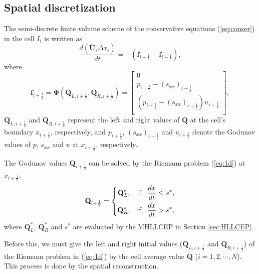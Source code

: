 \documentclass[review]{elsarticle}
\begin{document}
\subsection{Spatial discretization}
The  semi-discrete finite volume scheme of the conservative equations (\ref{eq:conser}) in the cell $I_i$ is written as
\begin{equation}\label{eq:sem}
  \frac{d(\overline{\mathbf{U}}_i\Delta x_i)}{dt} = -(\mathbf{f}_{i+\frac{1}{2}} - \mathbf{f}_{i-\frac{1}{2}}),
\end{equation}
where
\begin{equation}
  \mathbf{f}_{i+\frac{1}{2}} = \mathbf{\Phi} (\mathbf{Q}_{L,i+\frac{1}{2}}, \mathbf{Q}_{R,i+\frac{1}{2}})  = \left[
    \begin{array}{l}
      0\\
      p_{i+\frac{1}{2}} - (s_{xx})_{i+\frac{1}{2}}\\
      (p_{i+\frac{1}{2}} - (s_{xx})_{i+\frac{1}{2}})u_{i+\frac{1}{2}}\\
    \end{array}
  \right],
\end{equation}
$\mathbf{Q}_{L,i+\frac{1}{2}}$ and $\mathbf{Q}_{R,i+\frac{1}{2}}$ represent the left and right values of $\mathbf{Q}$ at the cell's boundary $x_{i+\frac{1}{2}}$, respectively, and  $p_{i+\frac{1}{2}}$, $(s_{xx})_{i+\frac{1}{2}}$ and $u_{i+\frac{1}{2}}$ denote the Godunov values of $p$, $s_{xx}$ and $u$ at $x_{i+\frac{1}{2}}$, respectively.

The Godunov values  $\mathbf{Q}_{i+\frac{1}{2}}$  can be solved  by the Riemann problem  (\ref{eq:1d}) at $x_{i+\frac{1}{2}}$,
\begin{equation}\label{eq:qLR}
  \mathbf{Q}_{i+\frac{1}{2}} = \left\{ \begin{aligned}
    \mathbf{Q}_L^*, \hspace{0.3cm} \text{if} \hspace{0.3cm} \frac{dx}{dt} \le  s^*,\\
    \mathbf{Q}_R^*, \hspace{0.3cm} \text{if} \hspace{0.3cm} \frac{dx}{dt} > s^*,\\
  \end{aligned} \right.
\end{equation}
where $\mathbf{Q}_L^*$, $\mathbf{Q}_R^*$ and $s^*$ are evaluated by the MHLLCEP in Section \ref{sec:HLLCEP}.

Before this, we must give the left  and right initial values ($\mathbf{Q}_{L,i+\frac{1}{2}}$ and $\mathbf{Q}_{R,i+\frac{1}{2}}$) of the Riemann problem in (\ref{eq:1d}) by the cell average value $\overline{\mathbf{Q}}$ ($i = 1,2,\cdots,N$). This process is done by the spatial reconstruction.
\end{document}
